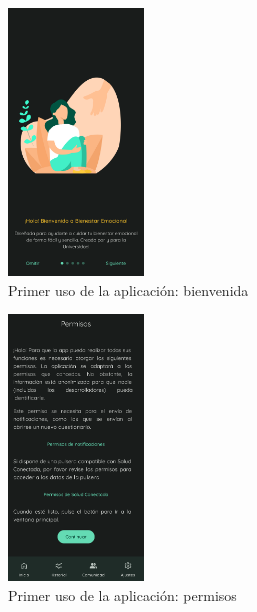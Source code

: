             \begin{figure}[h]
                \centering
                \includegraphics[width=0.32\textwidth]{figures/pruebas/primer_uso/Onboarding 1.png}
                \caption{Primer uso de la aplicación: bienvenida}
                \label{figure:pruebas:primer_uso_bienvenida}
            \end{figure}

            \begin{figure}[h]
                \centering
                \includegraphics[width=0.32\textwidth]{figures/pruebas/primer_uso/Permisos.png}
                \caption{Primer uso de la aplicación: permisos}
                \label{figure:pruebas:primer_uso_permisos}
            \end{figure}
            
